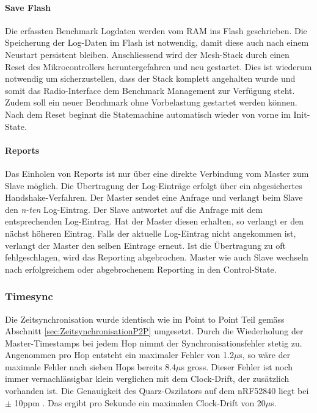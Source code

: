 \paragraph{Save Flash}
Die erfassten Benchmark Logdaten werden vom RAM ins Flash geschrieben.
Die Speicherung der Log-Daten im Flash ist notwendig, damit diese auch nach einem Neustart persistent bleiben.
Anschliessend wird der Mesh-Stack durch einen Reset des Mikrocontrollers heruntergefahren und neu gestartet.
Dies ist wiederum notwendig um sicherzustellen, dass der Stack komplett angehalten wurde und somit das Radio-Interface dem Benchmark Management zur Verfügung steht.
Zudem soll ein neuer Benchmark ohne Vorbelastung gestartet werden können.
Nach dem Reset beginnt die Statemachine automatisch wieder von vorne im Init-State. 

\paragraph{Reports}
Das Einholen von Reports ist nur über eine direkte Verbindung vom Master zum Slave möglich.
Die Übertragung der Log-Einträge erfolgt über ein abgesichertes Handshake-Verfahren.
Der Master sendet eine Anfrage und verlangt beim Slave den \textit{n-ten} Log-Eintrag.
Der Slave antwortet auf die Anfrage mit dem entsprechenden Log-Eintrag.
Hat der Master diesen erhalten, so verlangt er den nächst höheren Eintrag.
Falls der aktuelle Log-Eintrag nicht angekommen ist, verlangt der Master den selben Eintrage erneut.
Ist die Übertragung zu oft fehlgeschlagen, wird das Reporting abgebrochen.
Master wie auch Slave wechseln nach erfolgreichem oder abgebrochenem Reporting in den Control-State.  

\subsubsection{Timesync}\label{subsubsec:Timesync}
Die Zeitsynchronisation wurde identisch wie im Point to Point Teil gemäss Abschnitt \ref{sec:ZeitsynchronisationP2P} umgesetzt.
Durch die Wiederholung der Master-Timestamps bei jedem Hop nimmt der Synchronisationsfehler stetig zu.
Angenommen pro Hop entsteht ein maximaler Fehler von 1.2$\mu$s, so wäre der maximale Fehler nach sieben Hops bereits 8.4$\mu$s gross.
Dieser Fehler ist noch immer vernachlässigbar klein verglichen mit dem Clock-Drift, der zusätzlich vorhanden ist.
Die Genauigkeit des Quarz-Oszilators auf dem nRF52840 liegt bei $\pm$ 10ppm \cite{nordic_semiconductor_asa_nrf52840_ps_v11pdf_nodate}.
Das ergibt pro Sekunde ein maximalen Clock-Drift von 20$\mu$s. 

